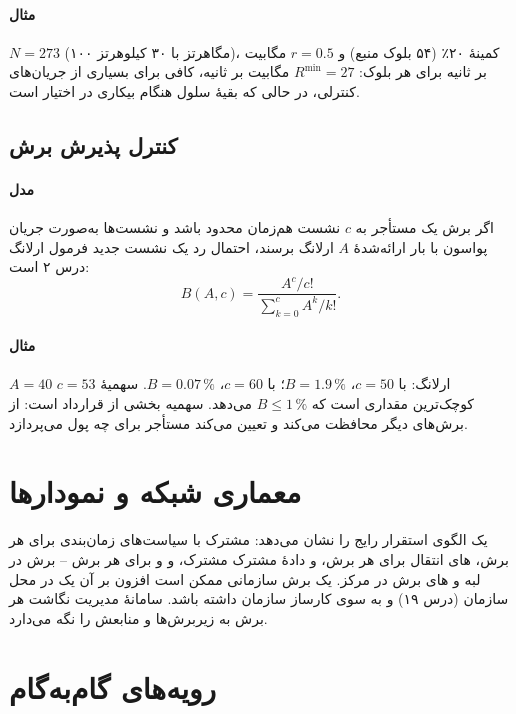 \documentclass[11pt,a4paper]{article}
\begin{document}
\paragraph{مثال} $N = 273$ (۱۰۰ مگاهرتز با ۳۰ کیلوهرتز)، کمینهٔ  ۲۰٪ (۵۴ بلوک منبع) و $r = 0.5$ مگابیت بر ثانیه برای هر بلوک:
$R^{\min} = 27$ مگابیت بر ثانیه، کافی برای بسیاری از جریان‌های کنترلی، در حالی که بقیهٔ سلول هنگام بیکاری  در اختیار
 است.

\subsection{کنترل پذیرش برش}\label{sec:nsac}
\paragraph{مدل} اگر برش یک مستأجر به $c$ نشست  هم‌زمان محدود باشد و نشست‌ها به‌صورت جریان پواسون با بار ارائه‌شدهٔ $A$
ارلانگ برسند، احتمال رد یک نشست جدید فرمول ارلانگ  درس ۲ است:
\begin{equation}\label{eq:block}
  B(A, c) = \frac{A^{c}/c!}{\sum_{k=0}^{c} A^{k}/k!} .
\end{equation}
\paragraph{مثال} $A = 40$ ارلانگ: با $c = 50$، $B = 1.9\,\%$؛ با $c = 60$، $B = 0.07\,\%$. سهمیهٔ $c = 53$ کوچک‌ترین مقداری است که $B \le 1\,\%$
می‌دهد. سهمیه بخشی از قرارداد است: از برش‌های دیگر محافظت می‌کند و تعیین می‌کند مستأجر برای چه پول می‌پردازد.

\section{معماری شبکه و نمودارها}
 یک الگوی استقرار رایج را نشان می‌دهد:  مشترک با سیاست‌های زمان‌بندی برای هر برش، های انتقال برای
هر برش،  و دادهٔ مشترک مشترک، و  و  برای هر برش --  برش  در لبه و های برش
 در مرکز. یک برش سازمانی ممکن است افزون بر آن یک  در محل سازمان (درس ۱۹) و  به سوی کارساز 
سازمان داشته باشد. سامانهٔ مدیریت نگاشت هر برش به زیربرش‌ها و منابعش را نگه می‌دارد.

\section{رویه‌های گام‌به‌گام}
\end{document}
